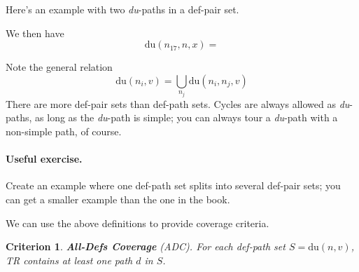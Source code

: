 \documentclass[11pt]{article}
\newtheorem{defn}{Definition}
\newtheorem{crit}{Criterion}
\begin{document}
Here's an example with two \emph{du}-paths in a def-pair set.
\begin{center}
\label{C}
\end{center}
{\sf We then have}
\[ \mbox{du}(n_{17}, n, x) = \]

Note the general relation
\[ \mbox{du}(n_i, v) = \bigcup_{n_j} \mbox{du}(n_i, n_j, v) \]
There are more def-pair sets than def-path sets. Cycles are 
always allowed as \emph{du}-paths, as long as the \emph{du}-path
is simple; you can always tour a \emph{du}-path with a non-simple
path, of course.

\paragraph{Useful exercise.} Create an example where one def-path
set splits into several def-pair sets; you can get a smaller example
than the one in the book.



We can use the above definitions to provide coverage criteria.
\begin{crit}
{\bf All-Defs Coverage} (ADC). For each def-path set $S = \mbox{du}(n, v)$,
TR contains at least one path $d$ in $S$.
\end{crit}
\end{document}

